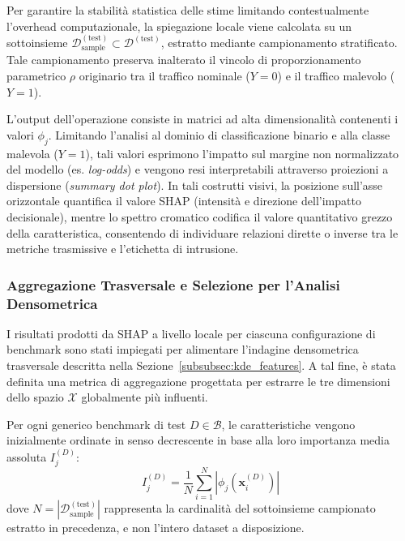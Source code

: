 Per garantire la stabilità statistica delle stime limitando contestualmente l'overhead computazionale, la spiegazione locale viene calcolata su un sottoinsieme $\mathcal{D}_{\text{sample}}^{(\text{test})} \subset \mathcal{D}^{(\text{test})}$, estratto mediante campionamento stratificato. Tale campionamento preserva inalterato il vincolo di proporzionamento parametrico $\rho$ originario tra il traffico nominale ($Y = 0$) e il traffico malevolo ($Y = 1$).
        
L'output dell'operazione consiste in matrici ad alta dimensionalità contenenti i valori $\phi_j$. Limitando l'analisi al dominio di classificazione binario e alla classe malevola ($Y = 1$), tali valori esprimono l'impatto sul margine non normalizzato del modello (es. \textit{log-odds}) e vengono resi interpretabili attraverso proiezioni a dispersione (\textit{summary dot plot}). In tali costrutti visivi, la posizione sull'asse orizzontale quantifica il valore SHAP (intensità e direzione dell'impatto decisionale), mentre lo spettro cromatico codifica il valore quantitativo grezzo della caratteristica, consentendo di individuare relazioni dirette o inverse tra le metriche trasmissive e l'etichetta di intrusione.

\subsubsection{Aggregazione Trasversale e Selezione per l'Analisi Densometrica}
\label{subsubsec:aggregazione_shap_kde}

I risultati prodotti da SHAP a livello locale per ciascuna configurazione di benchmark sono stati impiegati per alimentare l'indagine densometrica trasversale descritta nella Sezione~\ref{subsubsec:kde_features}. A tal fine, è stata definita una metrica di aggregazione progettata per estrarre le tre dimensioni dello spazio $\mathcal{X}$ globalmente più influenti.

Per ogni generico benchmark di test $D \in \mathcal{B}$, le caratteristiche vengono inizialmente ordinate in senso decrescente in base alla loro importanza media assoluta $I_j^{(D)}$:
\begin{equation}
    I_j^{(D)} = \frac{1}{N} \sum_{i=1}^N \left| \phi_j(\mathbf{x}_i^{(D)}) \right|
\end{equation}
dove $N = |\mathcal{D}_{\text{sample}}^{(\text{test})}|$ rappresenta la cardinalità del sottoinsieme campionato estratto in precedenza, e non l'intero dataset a disposizione.
        
